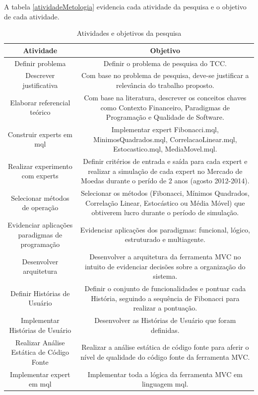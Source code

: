 A tabela \ref{atividadeMetologia}  evidencia cada atividade da pesquisa e o objetivo de cada atividade.

\begin{table}[H]
\caption{Atividades e objetivos da pesquisa}
\begin{center}
    \begin{tabular}{ | c | c |}
    \hline
    \textbf{Atividade} & \textbf{Objetivo} \\ \hline
	Definir problema & Definir o problema de pesquisa do TCC.\\ \hline
	Descrever justificativa & Com base no problema de pesquisa, deve-se justificar a relevância do trabalho proposto.\\ \hline
	Elaborar referencial teórico & Com base na literatura, descrever os conceitos chaves como Contexto Financeiro, Paradigmas de Programação e Qualidade de Software.\\ \hline
	Construir experts em mql & Implementar expert Fibonacci.mql, MinimosQuadrados.mql, CorrelacaoLinear.mql, Estocastico.mql, MediaMovel.mql. \\ \hline
	Realizar experimento com experts & Definir critérios de entrada e saída para cada expert e realizar a simulação de cada expert no Mercado de Moedas durante o perído de 2 anos (agosto 2012-2014).\\ \hline
	Selecionar métodos de operação & Selecionar os métodos (Fibonacci, Mínimos Quadrados, Correlação Linear, Estocástico ou Média Móvel) que obtiverem lucro durante o período de simulação.\\ \hline
	Evidenciar aplicações paradigmas de programação & Evidenciar aplicações dos paradigmas: funcional, lógico, estruturado e multiagente.\\ \hline
	Desenvolver arquitetura & Desenvolver a arquitetura da ferramenta MVC no intuito de evidenciar decisões sobre a organização do sistema.\\ \hline
	Definir Histórias de Usuário & Definir o conjunto de funcionalidades e pontuar cada História, seguindo a sequência de Fibonacci para realizar a pontuação.\\ \hline
	Implementar Histórias de Usuário & Desenvolver as Histórias de Usuário que foram definidas.\\ \hline
	Realizar Análise Estática de Código Fonte & Realizar a análise estática de código fonte para aferir o nível de qualidade do código fonte da ferramenta MVC.\\ \hline
	Implementar expert em mql & Implementar toda a lógica da ferramenta MVC em linguagem mql.\\ \hline

\end{tabular}
\end{center}
\end{table}
